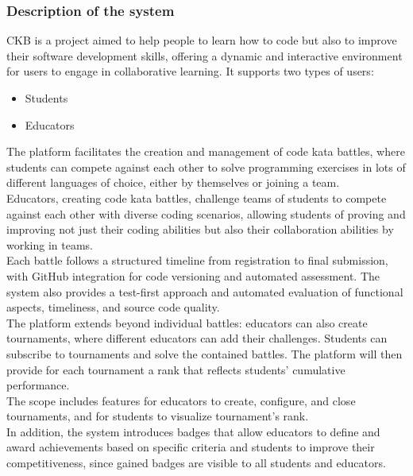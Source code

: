 \subsubsection{Description of the system}
CKB is a project aimed to help people to learn how to code but also to improve their software development skills, offering a dynamic and interactive environment for users to engage in collaborative learning. It supports two types of users:
\begin{itemize}
  \item Students
  \item Educators
\end{itemize}
The platform facilitates the creation and management of code kata battles, where students can compete against each other to solve programming exercises in lots of different languages of choice, 
either by themselves or joining a team.  \\
Educators, creating code kata battles, challenge teams of students to compete against each other with diverse coding scenarios, allowing students of proving and improving not just their coding abilities but also their collaboration abilities by working in teams. \\
Each battle follows a structured timeline from registration to final submission, with GitHub integration for code versioning and automated assessment.
The system also provides a test-first approach and automated evaluation of functional aspects, timeliness, and source code quality. \\
The platform extends beyond individual battles: educators can also create tournaments, where different educators can add their challenges. Students can subscribe to tournaments and solve the contained battles. The platform will then provide for each tournament a rank that reflects students' cumulative performance. \\
The scope includes features for educators to create, configure, and close tournaments, and for students to visualize tournament's rank. \\
In addition, the system introduces badges that allow educators to define and award achievements based on specific criteria and students to improve their competitiveness, since gained badges are visible to all students and educators. \\
